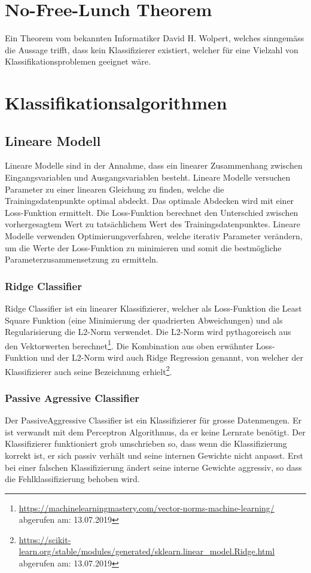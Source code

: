 \section{No-Free-Lunch Theorem}\label{sec:nofreelunch}
Ein Theorem vom bekannten Informatiker David H. Wolpert, welches sinngemäss die Aussage trifft, dass kein Klassifizierer existiert, welcher für eine Vielzahl von Klassifikationsproblemen geeignet wäre\cite[p.]{Wolpert1996TheLO}.

\section{Klassifikationsalgorithmen}
\subsection{Lineare Modell}
Lineare Modelle sind in der Annahme, dass ein linearer Zusammenhang zwischen Eingangsvariablen und Ausgangsvariablen besteht.
Lineare Modelle versuchen Parameter zu einer linearen Gleichung zu finden, welche die Trainingsdatenpunkte optimal abdeckt.
Das optimale Abdecken wird mit einer Loss-Funktion ermittelt.
Die Loss-Funktion berechnet den Unterschied zwischen vorhergesagtem Wert zu tatsächlichem Wert des Trainingsdatenpunktes.
Lineare Modelle verwenden Optimierungsverfahren, welche iterativ Parameter verändern, um die Werte der Loss-Funktion zu minimieren und somit die bestmögliche Parameterzusammensetzung zu ermitteln.
\subsubsection{Ridge Classifier}
Ridge Classifier ist ein linearer Klassifizierer, welcher als Loss-Funktion die \glqq Least Square\grqq{} Funktion (eine Minimierung der quadrierten Abweichungen) und als Regularisierung die L2-Norm verwendet. Die L2-Norm wird pythagoreisch aus den Vektorwerten berechnet\footnote{\url{https://machinelearningmastery.com/vector-norms-machine-learning/} abgerufen am: 13.07.2019}.
Die Kombination aus oben erwähnter Loss-Funktion und der L2-Norm wird auch \glqq Ridge Regression\grqq{} genannt, von welcher der Klassifizierer auch seine Bezeichnung erhielt\footnote{\url{https://scikit-learn.org/stable/modules/generated/sklearn.linear_model.Ridge.html} abgerufen am: 13.07.2019}\cite{scikit-learn}.
\subsubsection{Passive Agressive Classifier}
Der PassiveAggressive Classifier ist ein Klassifizierer für grosse Datenmengen.
Er ist verwandt mit dem Perceptron Algorithmus, da er keine Lernrate benötigt.
Der Klassifizierer funktioniert grob umschrieben so, dass wenn die Klassifizierung korrekt ist, er sich passiv verhält und seine internen Gewichte nicht anpasst.
Erst bei einer falschen Klassifizierung ändert seine interne Gewichte aggressiv, so dass die Fehlklassifizierung behoben wird\cite{crammer2006online}.
